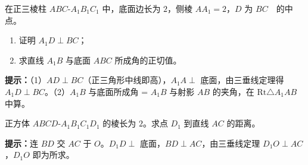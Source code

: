 \documentclass{exam-zh}
\begin{document}

\begin{problem}[points=12]
  \noindent
  \begin{minipage}[t]{\dimexpr\linewidth-70mm-6mm\relax}
    \vspace{0pt}
    在正三棱柱 $ABC\text{-}A_1B_1C_1$ 中，底面边长为 $2$，侧棱 $AA_1=2$，$D$ 为 $BC$\ \ 的中点。
\begin{enumerate}[label=(\arabic*)]
  \item 证明 $A_1D\perp BC$；
\ \  \item 求直线 $A_1B$ 与底面 $ABC$ 所成角的正切值。
\end{enumerate}

    \begin{hintbox}
\textbf{提示：}（1）$AD\perp BC$（正三角形中线即高），$A_1A\perp$ 底面，由三垂线定理得 $A_1D\perp BC$。（2）$A_1B$ 与底面所成角 = $A_1B$ 与射影 $AB$ 的夹角，在 $\text{Rt}\triangle A_1AB$ 中算。\end{hintbox}

  \end{minipage}\hfill
  \begin{diagramcoltikz}{70mm}{正三棱柱，标出 $A_1D$、$BC$ 及 $A_1B$ 与底面的线面角。}
  }
  \end{diagramcoltikz}
  \par\medskip
  \answerarea[62mm]
\end{problem}



\begin{problem}[points=10]
  \noindent
  \begin{minipage}[t]{\dimexpr\linewidth-70mm-6mm\relax}
    \vspace{0pt}
    正方体 $ABCD\text{-}A_1B_1C_1D_1$ 的棱长为 $2$。求点 $D_1$ 到直线 $AC$ 的距离。

    \begin{hintbox}
\textbf{提示：}连 $BD$ 交 $AC$ 于 $O$。$D_1D\perp$ 底面，$BD\perp AC$，由三垂线定理 $D_1O\perp AC$，$D_1O$ 即为所求。\end{hintbox}

  \end{minipage}\hfill
  \begin{diagramcoltikz}{70mm}{正方体，标出 $D_1$ 到 $AC$ 的垂线段 $D_1O$。}
  }
  \end{diagramcoltikz}
  \par\medskip
  \answerarea[55mm]
\end{problem}
\end{document}
